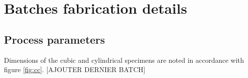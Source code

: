 
\chapter{Batches fabrication details} %

\label{AppendixA} %

\section{Process parameters}
\label{ppa}
Dimensions of the cubic and cylindrical specimens are noted in accordance with figure \ref{fig:cc}. [AJOUTER DERNIER BATCH]\\
\begin{table}[ht]
\noindent{}
\end{table}
